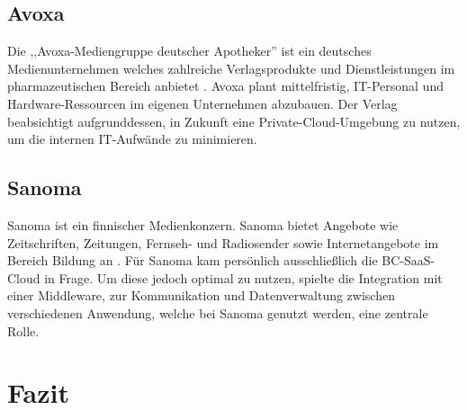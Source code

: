 \documentclass[12pt,bibtotoc]{article}
\begin{document}
			\subsection{Avoxa}\label{Avoxa}
			Die ,,Avoxa-Mediengruppe deutscher Apotheker'' ist ein deutsches Medienunternehmen welches zahlreiche Verlagsprodukte und Dienstleistungen im pharmazeutischen Bereich anbietet \cite{Avoxa-Website.2024}. \newline 
			Avoxa plant mittelfristig, IT-Personal und Hardware-Ressourcen im eigenen Unternehmen abzubauen. Der Verlag beabsichtigt aufgrunddessen, in Zukunft eine Private-Cloud-Umgebung zu nutzen, um die internen IT-Aufwände zu minimieren.
			\subsection{Sanoma}\label{Sanoma}
			Sanoma ist ein finnischer Medienkonzern. Sanoma bietet Angebote wie Zeitschriften, Zeitungen, Fernseh- und  Radiosender sowie Internetangebote im Bereich Bildung an \cite{Sanoma-Website.2024}. \newline
			Für Sanoma kam persönlich ausschließlich die BC-SaaS-Cloud in Frage. Um diese jedoch optimal zu nutzen, spielte die Integration mit einer Middleware, zur Kommunikation und Datenverwaltung zwischen verschiedenen Anwendung, welche bei Sanoma genutzt werden, eine zentrale Rolle.
		\newpage
	\section{Fazit}
\end{document}
